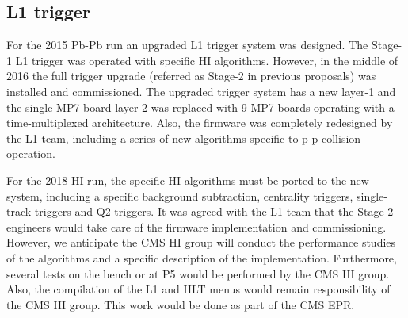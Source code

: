 \subsection{L1 trigger\label{subsec:L1Trigger}}
For the 2015 Pb-Pb run an upgraded L1 trigger system was designed. The Stage-1 L1 trigger was operated with specific HI algorithms. However, in the middle of 2016 the full trigger upgrade (referred as Stage-2 in previous proposals) was installed and commissioned. The upgraded trigger system has a new layer-1 and the single MP7 board layer-2 was replaced with 9 MP7 boards operating with a time-multiplexed architecture. Also, the firmware was completely redesigned by the L1 team, including a series of new algorithms specific to p-p collision operation. 

For the 2018 HI run, the specific HI algorithms must be ported to the new system, including a specific background subtraction, centrality triggers, single-track triggers and Q2 triggers. It was agreed with the L1 team that the Stage-2 engineers would take care of the firmware implementation and commissioning. However, we anticipate the CMS HI group will conduct the performance studies of the algorithms and a specific description of the implementation. Furthermore, several tests on the bench or at P5 would be performed by the CMS HI group. Also, the compilation of the L1 and HLT menus would remain responsibility of the CMS HI group. This work would be done as part of the CMS EPR.
